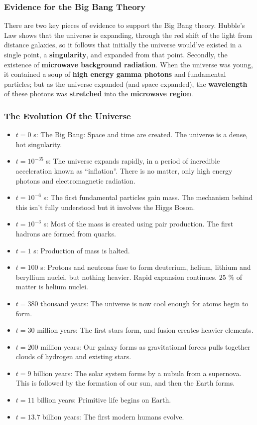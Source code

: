\subsubsection{Evidence for the Big Bang Theory}

There are two key pieces of evidence to support the Big Bang theory. Hubble's Law shows that the universe is expanding, through the red shift of the light from distance galaxies, so it follows that initially the universe would've existed in a single point, a \textbf{singularity}, and expanded from that point. Secondly, the existence of \textbf{microwave background radiation}. When the universe was young, it contained a soup of \textbf{high energy gamma photons} and fundamental particles; but as the universe expanded (and space expanded), the \textbf{wavelength} of these photons was \textbf{stretched} into the \textbf{microwave region}. 

\subsubsection{The Evolution Of the Universe}

\begin{itemize}
    \item $t = 0$ s: The Big Bang: Space and time are created. The universe is a dense, hot singularity.
    \item $t = 10^{-35}$ s: The universe expands rapidly, in a period of incredible acceleration known as ``inflation''. There is no matter, only high energy photons and electromagnetic radiation. 
    \item $t=10^{-6}$ s: The first fundamental particles gain mass. The mechanism behind this isn't fully understood but it involves the Higgs Boson.
    \item $t = 10^{-3}$ s: Most of the mass is created using pair production. The first hadrons are formed from quarks. 
    \item $t = 1$ s: Production of mass is halted.
    \item $t = 100$ s: Protons and neutrons fuse to form deuterium, helium, lithium and beryllium nuclei, but nothing heavier. Rapid expansion continues. $25$ \% of matter is helium nuclei. 
    \item $t = 380$ thousand years: The universe is now cool enough for atoms begin to form.
    \item $t = 30$ million years: The first stars form, and fusion creates heavier elements. 
    \item $t = 200$ million years: Our galaxy forms as gravitational forces pulls together clouds of hydrogen and existing stars.
    \item $t = 9$ billion years: The solar system forms by a nubula from a supernova. This is followed by the formation of our sun, and then the Earth forms. 
    \item $t = 11$ billion years: Primitive life begins on Earth.
    \item $t = 13.7$ billion years: The first modern humans evolve.
\end{itemize}

